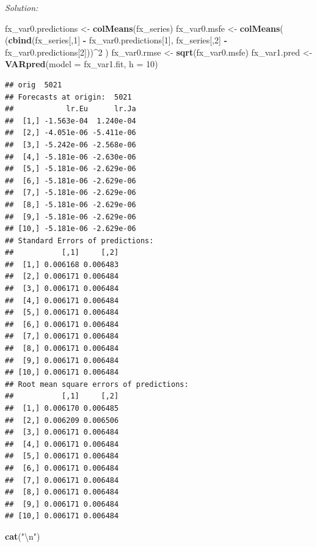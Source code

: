 \documentclass[12pt,a4paper]{article}
\newenvironment{Shaded}{\begin{snugshade}}{\end{snugshade}}
\newcommand{\CharTok}[1]{\textcolor[rgb]{0.31,0.60,0.02}{#1}}
\newcommand{\DataTypeTok}[1]{\textcolor[rgb]{0.13,0.29,0.53}{#1}}
\newcommand{\DecValTok}[1]{\textcolor[rgb]{0.00,0.00,0.81}{#1}}
\newcommand{\KeywordTok}[1]{\textcolor[rgb]{0.13,0.29,0.53}{\textbf{#1}}}
\newcommand{\NormalTok}[1]{#1}
\newcommand{\OperatorTok}[1]{\textcolor[rgb]{0.81,0.36,0.00}{\textbf{#1}}}
\newcommand{\StringTok}[1]{\textcolor[rgb]{0.31,0.60,0.02}{#1}}
\begin{document}
\emph{Solution:}

\begin{Shaded}
\begin{Highlighting}[]
\NormalTok{fx_var0.predictions <-}\StringTok{ }\KeywordTok{colMeans}\NormalTok{(fx_series) }
\NormalTok{fx_var0.msfe <-}\StringTok{ }\KeywordTok{colMeans}\NormalTok{( (}\KeywordTok{cbind}\NormalTok{(fx_series[,}\DecValTok{1}\NormalTok{] }\OperatorTok{-}\StringTok{ }\NormalTok{fx_var0.predictions[}\DecValTok{1}\NormalTok{], fx_series[,}\DecValTok{2}\NormalTok{] }\OperatorTok{-}\StringTok{ }\NormalTok{fx_var0.predictions[}\DecValTok{2}\NormalTok{]))}\OperatorTok{^}\DecValTok{2}\NormalTok{ )}
\NormalTok{fx_var0.rmse <-}\StringTok{ }\KeywordTok{sqrt}\NormalTok{(fx_var0.msfe)}
\NormalTok{fx_var1.pred <-}\StringTok{ }\KeywordTok{VARpred}\NormalTok{(}\DataTypeTok{model =}\NormalTok{ fx_var1.fit, }\DataTypeTok{h =} \DecValTok{10}\NormalTok{)}
\end{Highlighting}
\end{Shaded}

\begin{verbatim}
## orig  5021 
## Forecasts at origin:  5021 
##            lr.Eu      lr.Ja
##  [1,] -1.563e-04  1.240e-04
##  [2,] -4.051e-06 -5.411e-06
##  [3,] -5.242e-06 -2.568e-06
##  [4,] -5.181e-06 -2.630e-06
##  [5,] -5.181e-06 -2.629e-06
##  [6,] -5.181e-06 -2.629e-06
##  [7,] -5.181e-06 -2.629e-06
##  [8,] -5.181e-06 -2.629e-06
##  [9,] -5.181e-06 -2.629e-06
## [10,] -5.181e-06 -2.629e-06
## Standard Errors of predictions:  
##           [,1]     [,2]
##  [1,] 0.006168 0.006483
##  [2,] 0.006171 0.006484
##  [3,] 0.006171 0.006484
##  [4,] 0.006171 0.006484
##  [5,] 0.006171 0.006484
##  [6,] 0.006171 0.006484
##  [7,] 0.006171 0.006484
##  [8,] 0.006171 0.006484
##  [9,] 0.006171 0.006484
## [10,] 0.006171 0.006484
## Root mean square errors of predictions:  
##           [,1]     [,2]
##  [1,] 0.006170 0.006485
##  [2,] 0.006209 0.006506
##  [3,] 0.006171 0.006484
##  [4,] 0.006171 0.006484
##  [5,] 0.006171 0.006484
##  [6,] 0.006171 0.006484
##  [7,] 0.006171 0.006484
##  [8,] 0.006171 0.006484
##  [9,] 0.006171 0.006484
## [10,] 0.006171 0.006484
\end{verbatim}

\begin{Shaded}
\begin{Highlighting}[]
\KeywordTok{cat}\NormalTok{(}\StringTok{"}\CharTok{\textbackslash{}n}\StringTok{"}\NormalTok{)}
\end{Highlighting}
\end{Shaded}
\end{document}
